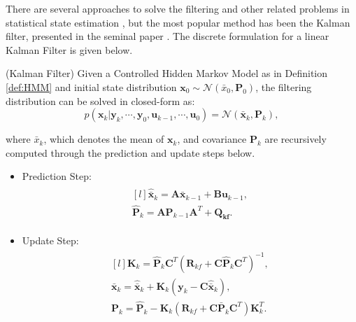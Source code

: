 \documentclass[a4paper,11pt]{book}
\numberwithin{figure}{chapter}
\numberwithin{equation}{chapter}
\numberwithin{table}{chapter}
\newtheorem{theorem}{Theorem}[chapter]
\theoremstyle{definition}
\newcounter{boxed-theorem}
\newenvironment{boxed-theorem}[1]
{\colorlet{shadecolor}{pastelBlue2!5} \begin{shaded} \begin{theorem}{#1}}
{\end{theorem} \end{shaded}}
\newcounter{boxed-lemma}
\newcounter{boxed-definition}
\newcounter{boxed-example}
\begin{document}
There are several approaches to solve the filtering and other related problems in statistical state estimation \cite{Sarkka:2013}, but the most popular method has been the Kalman filter, presented in the seminal paper \cite{KalmanF:1960}. The discrete formulation for a linear Kalman Filter is given below.

\begin{boxed-theorem}{(Kalman Filter)} \label{th:kalmanFilter}
    Given a Controlled Hidden Markov Model as in Definition \ref{def:HMM} and initial state distribution $\bm{x}_0 \sim \mathcal{N}(\bar{x}_0, \bm{P}_0)$, the filtering distribution can be solved in closed-form as:
    \begin{equation}
        p(\bm{x}_k | \bm{y}_{k}, \cdots, \bm{y}_0, \bm{u}_{k-1}, \cdots, \bm{u}_0)  = \mathcal{N}(\bar{\bm{x}}_k, \bm{P}_k)
    ,\end{equation}   
    
    \noindent where $\bar{x}_k$, which denotes the mean of $\bm{x}_k$, and covariance $\bm{P}_k$ are recursively computed through the prediction and update steps below.
    \begin{itemize}
    	\item Prediction Step:
    	\begin{align}
	    \begin{matrix*}[l]
		    \hat{\bar{\bm{x}}}_k = \bm{A} \bar{\bm{x}}_{k-1} + \bm{B} \bm{u}_{k-1},  \\
		    \hat{\bm{P}}_k = \bm{A} \bm{P}_{k-1} \bm{A}^T + \bm{Q_{kf}}.
		\end{matrix*}
		\end{align}
		
		\item Update Step:
		\begin{align}
	    \begin{matrix*}[l] 
		    \bm{K}_k = \hat{\bm{P}}_k \bm{C}^T (\bm{R}_{kf} + \bm{C} \hat{\bm{P}}_k \bm{C}^T)^{-1} ,\\
		    \bar{\bm{x}}_k = \hat{\bar{\bm{x}}}_k + \bm{K}_k(\bm{y}_k - \bm{C} \hat{\bar{\bm{x}}}_k), \\
		    \bm{P}_k = \hat{\bm{P}}_k - \bm{K}_k (\bm{R}_{kf} + \bm{C} \bar{\bm{P}}_k \bm{C}^T) \bm{K}_k^T.
	    \end{matrix*}   
	    \end{align}
	    \end{itemize}
\end{boxed-theorem}
\end{document}
